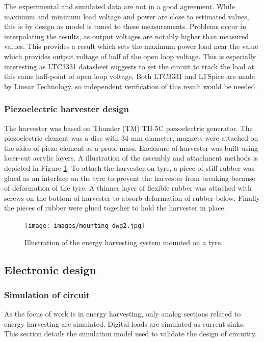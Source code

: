 The experimental and simulated data are not in a good agreement. While maximum and minimum load voltage and power are close to estimated values, this is by design as model is tuned to these measurements. Problems occur in interpolating the results, as output voltages are notably higher than measured values. This provides a result which sets the maximum power load near the value which provides output voltage of half of the open loop voltage. This is especially interesting as LTC3331 datasheet \cite{LTC3331} suggests to set the circuit to track the load at this same half-point of open loop voltage. Both LTC3331 and LTSpice are made by Linear Technology, so independent verification of this result would be needed. 

\subsubsection{Piezoelectric harvester design}
The harvester was based on Thunder (TM) TH-5C \cite{th5c} piezoelectric generator. The piezoelectric element was a disc with 34 mm diameter, magnets were attached on the sides of piezo element as a proof mass. Enclosure of harvester was built using laser-cut acrylic layers. A illustration of the assembly and attachment methods is depicted in Figure \ref{fig:harvester_dwg}. To attach the harvester on tyre, a piece of stiff rubber was glued as an interface on the tyre to prevent the harvester from breaking because of deformation of the tyre. A thinner layer of flexible rubber was attached with screws on the bottom of harvester to absorb deformation of rubber below. Finally the pieces of rubber were glued together to hold the harvester in place.

\begin{figure}[htb]
\begin{center}
\texttt{[image: images/mounting\_dwg2.jpg]}
\end{center}
\caption{\label{fig:harvester_dwg} Illustration of the energy harvesting system mounted on a tyre.}
\end{figure}




\subsection{Electronic design} \label{sect:electronic_design}
\subsubsection{Simulation of circuit}
As the focus of work is in energy harvesting, only analog sections related to energy harvesting are simulated. Digital loads are simulated as current sinks. This section details the simulation model used to validate the design of circuitry.

